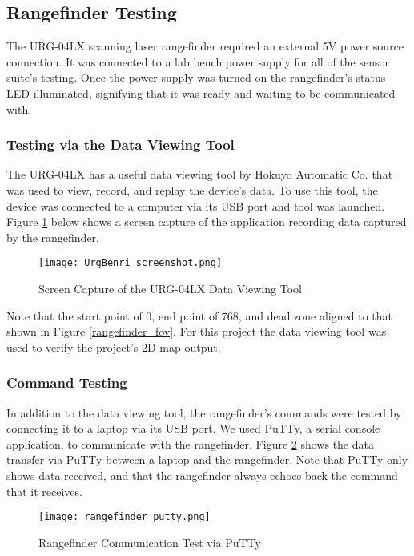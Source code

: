 \subsection{Rangefinder Testing}
The URG-04LX scanning laser rangefinder required an external 5V power source connection. It was connected to a lab bench power supply for all of the sensor suite's testing. Once the power supply was turned on the rangefinder's status LED illuminated, signifying that it was ready and waiting to be communicated with.

\subsubsection{Testing via the Data Viewing Tool}
The URG-04LX has a useful data viewing tool by Hokuyo Automatic Co. that was used to view, record, and replay the device's data. To use this tool, the device was connected to a computer via its USB port and tool was launched. Figure \ref{URGBenriStandard_pic} below shows a screen capture of the application recording data captured by the rangefinder.

\begin{figure}[H]
	\centerline{\texttt{[image: UrgBenri\_screenshot.png]}}
	\caption{Screen Capture of the URG-04LX Data Viewing Tool \cite{URGBenriStandard_ref}}
	\label{URGBenriStandard_pic}
\end{figure}

Note that the start point of 0, end point of 768, and dead zone aligned to that shown in Figure \ref{rangefinder_fov}. For this project the data viewing tool was used to verify the project's 2D map output.

\subsubsection{Command Testing}
In addition to the data viewing tool, the rangefinder's commands were tested by connecting it to a laptop via its USB port. We used PuTTy, a serial console application, to communicate with the rangefinder. Figure \ref{rangefinder_putty} shows the data transfer via PuTTy between a laptop and the rangefinder. Note that PuTTy only shows data received, and that the rangefinder always echoes back the command that it receives.

\begin{figure}[H]
	\centerline{\texttt{[image: rangefinder\_putty.png]}}
	\caption{Rangefinder Communication Test via PuTTy}
	\label{rangefinder_putty}
\end{figure}

